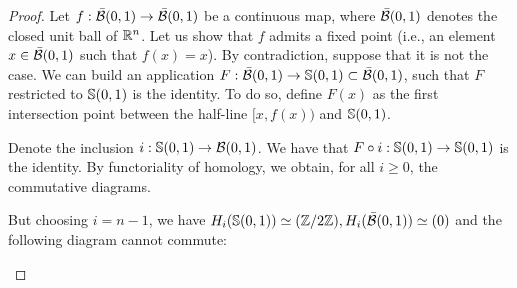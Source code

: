 \begin{proof}
    Let $f : \bar{\mathcal{B}}(0,1) \to \bar{\mathcal{B}}(0,1)$ be a continuous map, where
    $\bar{\mathcal{B}}(0,1)$ denotes the closed unit ball of $\mathbb{R}^n$. Let us show that
    $f$ admits a fixed point (i.e., an element $x \in \bar{\mathcal{B}}(0, 1)$ such
    that $f(x) = x$). By contradiction, suppose that it is not the case. We
    can build an application $F : \bar{\mathcal{B}}(0,1) \to \mathbb{S}(0, 1) \subset  \bar{\mathcal{B}}(0,1)$, such that
    $F$ restricted to $\mathbb{S}(0, 1)$ is the identity. To do so, define $F(x)$ as
    the first intersection point between the half-line $[x, f(x))$ and
    $\mathbb{S}(0, 1)$. 
    
    Denote the inclusion $i: \mathbb{S}(0, 1) \to \mathcal{B}(0, 1)$. We
    have that $F \circ i: \mathbb{S}(0, 1) \to \mathbb{S}(0, 1)$ is the identity. By
    functoriality of homology, we obtain, for all $i \ge 0$, the commutative
    diagrams. 

    \begin{figure}[H]
        \begin{center}
        \end{center}
    \end{figure}

But choosing $i = n - 1$, we have $H_i(\mathbb{S}(0, 1)) \simeq (\mathbb{Z}/2\mathbb{Z}),
H_i(\bar{\mathcal{B}}(0, 1)) \simeq (0)$ and the following diagram cannot commute:

\begin{figure}[H]
    \begin{center}
    \end{center}
\end{figure}

\end{proof}

